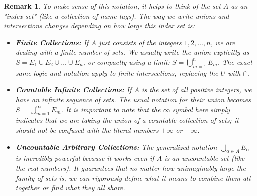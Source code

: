 \documentclass{article}
\theoremstyle{mythm}
\newtheorem{remark}[theorem]{Remark}
\begin{document}
\begin{remark}
To make sense of this notation, it helps to think of the set $A$ as an "index set" (like a collection of name tags). The way we write unions and intersections changes depending on how large this index set is:

\begin{itemize}
    \item \textbf{Finite Collections:} If $A$ just consists of the integers $1, 2, \dots, n$, we are dealing with a finite number of sets. We usually write the union explicitly as $S = E_1 \cup E_2 \cup \dots \cup E_n$, or compactly using a limit: $S = \bigcup_{m=1}^n E_m$. The exact same logic and notation apply to finite intersections, replacing the $U$ with $\cap$.
    
    \item \textbf{Countable Infinite Collections:} If $A$ is the set of all positive integers, we have an infinite sequence of sets. The usual notation for their union becomes $S = \bigcup_{m=1}^\infty E_m$. It is important to note that the $\infty$ symbol here simply indicates that we are taking the union of a \textit{countable} collection of sets; it should not be confused with the literal numbers $+\infty$ or $-\infty$.
    
    \item \textbf{Uncountable Arbitrary Collections:} The generalized notation $\bigcup_{\alpha \in A} E_\alpha$ is incredibly powerful because it works even if $A$ is an \textit{uncountable} set (like the real numbers). It guarantees that no matter how unimaginably large the family of sets is, we can rigorously define what it means to combine them all together or find what they all share.
\end{itemize}
\end{remark}
\end{document}
